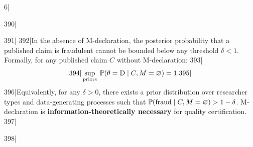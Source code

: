 6|\documentclass[12pt,a4paper]{article}
\begin{document}
390|\begin{theorem}
391|\label{thm:non_declaration}
392|In the absence of M-declaration, the posterior probability that a published claim is fraudulent cannot be bounded below any threshold $\delta < 1$. Formally, for any published claim $C$ without M-declaration:
393|\begin{equation}\label{eq:sup_fraud}
394|    \sup_{\text{priors}} \; \mathbb{P}(\theta = \text{D} \mid C, M = \varnothing) = 1.
395|\end{equation}
396|Equivalently, for any $\delta > 0$, there exists a prior distribution over researcher types and data-generating processes such that $\mathbb{P}(\text{fraud} \mid C, M = \varnothing) > 1 - \delta$. M-declaration is \textbf{information-theoretically necessary} for quality certification.
397|\end{theorem}
398|
\end{document}
